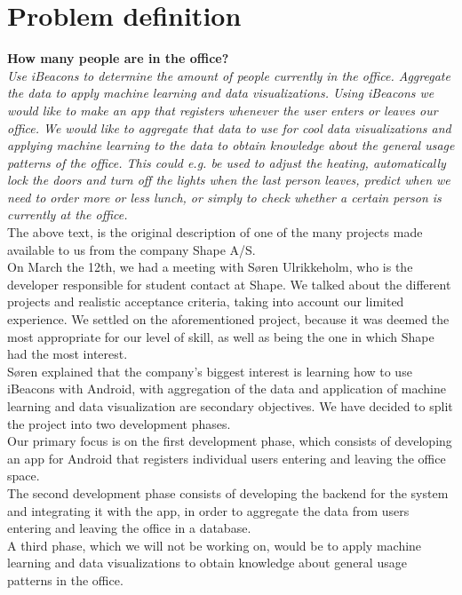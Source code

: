 \documentclass[12pt]{article}
\begin{document}
\newpage
\section{Problem definition}
\textbf{How many people are in the office?}\\
\textit{Use iBeacons to determine the amount of people currently in the office. Aggregate the data to apply machine learning and data visualizations.
Using iBeacons we would like to make an app that registers whenever the user enters or leaves our office. We would like to aggregate that data to use for cool data visualizations and applying machine learning to the data to obtain knowledge about the general usage patterns of the office. This could e.g. be used to adjust the heating, automatically lock the doors and turn off the lights when the last person leaves, predict when we need to order more or less lunch, or simply to check whether a certain person is currently at the office.} \cite{website}\\

The above text, is the original description of one of the many projects made available to us from the company Shape A/S.\\

On March the 12th, we had a meeting with S\o ren Ulrikkeholm, who is the developer responsible for student contact at Shape. We talked about the different projects and realistic acceptance criteria, taking into account our limited experience. We settled on the aforementioned project, because it was deemed the most appropriate for our level of skill, as well as being the one in which Shape had the most interest.\\

S\o ren explained that the company's biggest interest is learning how to use iBeacons with Android, with aggregation of the data and application of machine learning and data visualization are secondary objectives. We have decided to split the project into two development phases.\\

Our primary focus is on the first development phase, which consists of developing an app for Android that registers individual users entering and leaving the office space.\\

The second development phase consists of developing the backend for the system and integrating it with the app, in order to aggregate the data from users entering and leaving the office in a database.\\
A third phase, which we will not be working on, would be to apply machine learning and data visualizations to obtain knowledge about general usage patterns in the office.
\end{document}
